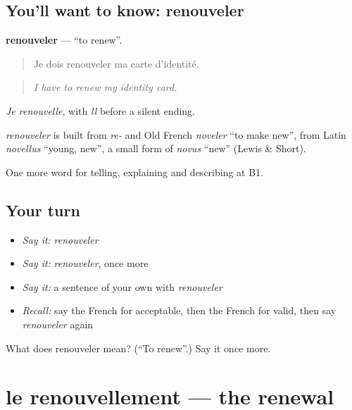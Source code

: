 \subsection*{You'll want to know: renouveler}
\textbf{renouveler} — \textquotedblleft{}to renew\textquotedblright{}.

\begin{quote}
Je dois renouveler ma carte d'identité.
\end{quote}

\begin{quote}
\emph{I have to renew my identity card.}
\end{quote}

\emph{Je renouvelle}, with \emph{ll} before a silent ending.

\begin{cousinweb}
\emph{renouveler} is built from \emph{re-} and Old French \emph{noveler} \textquotedblleft{}to make new\textquotedblright{}, from Latin \emph{novellus} \textquotedblleft{}young, new\textquotedblright{}, a small form of \emph{novus} \textquotedblleft{}new\textquotedblright{} (Lewis \& Short).
\end{cousinweb}

\begin{grammarlens}[title={What you've built}]
One more word for telling, explaining and describing at B1.
\end{grammarlens}

\subsection*{Your turn}
\begin{itemize}
\raggedright
  \item \emph{Say it:} \emph{renouveler}
  \item \emph{Say it:} \emph{renouveler}, once more
  \item \emph{Say it:} a sentence of your own with \emph{renouveler}
  \item \emph{Recall:} say the French for acceptable, then the French for valid, then say \emph{renouveler} again
\end{itemize}

\begin{tcolorbox}[breakable,colback=teal!4,colframe=teal!35!black,title={Before you move on}]
What does renouveler mean? (\textquotedblleft{}To renew\textquotedblright{}.) Say it once more.
\end{tcolorbox}
\section[le renouvellement]{le renouvellement — the renewal}

